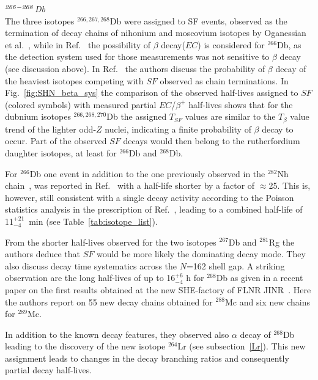 {\it $^{\it266-268}$Db}\\
The three isotopes $^{266,267,268}$Db were assigned to SF events, observed as the termination of decay chains of nihonium and moscovium isotopes by Oganessian et al.~\cite{Oganessian2004}, while in Ref.~\cite{Oganessian2007b} the possibility of $\beta$ decay($EC$) is considered for $^{266}$Db, as the detection system used for those measurements was not sensitive to $\beta$ decay (see discussion above). 
In Ref.~\cite{Oganessian2015} the authors discuss the probability of $\beta$ decay of the heaviest isotopes competing with $SF$ observed as chain terminations. 
In Fig.~\ref{fig:SHN_beta_sys} the comparison of the observed half-lives assigned to $SF$ (colored symbols) with measured partial $EC$/$\beta^+$ half-lives shows that for the dubnium isotopes $^{266,268,270}$Db the assigned $T_{SF}$ values are similar to the $T_{\beta}$ value trend of the lighter odd-$Z$ nuclei, indicating a finite probability of $\beta$ decay to occur. 
Part of the observed $SF$ decays would then belong to the rutherfordium daughter isotopes, at least for $^{266}$Db and $^{268}$Db.

For $^{266}$Db one event in addition to the one previously observed in the $^{282}$Nh chain~\cite{Oganessian2007}, was reported in Ref.~\cite{Oganessian2022d} with a half-life shorter by a factor of $\approx$25. 
This is, however, still consistent with a single decay activity according to the Poisson statistics analysis in the prescription of Ref.~\cite{Schmidt2000}, leading to a combined half-life of 11$^{+21}_{-4}$~min (see Table~\ref{tab:isotope_list}).

From the shorter half-lives observed for the two isotopes $^{267}$Db and $^{281}$Rg the authors deduce that $SF$ would be more likely the dominating decay mode.
They also discuss decay time systematics across the $N$=162 shell gap. 
A striking observation are the long half-lives of up to 16$^{+6}_{-4}$ h for $^{268}$Db as given in a recent paper on the first results obtained at the new SHE-factory of FLNR JINR~\cite{Oganessian2022c}.  
Here the authors report on 55 new decay chains obtained for $^{288}$Mc and six new chains for $^{289}$Mc. 

In addition to the known decay features, they observed also $\alpha$ decay of $^{268}$Db leading to the discovery of the new isotope $^{264}$Lr (see subsection~\ref{Lr}). 
This new assignment leads to changes in the decay branching ratios and consequently partial decay half-lives. 

